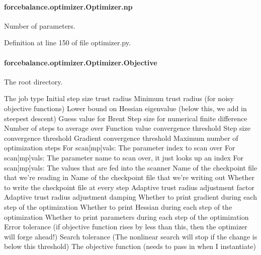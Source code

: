 \hypertarget{classforcebalance_1_1optimizer_1_1Optimizer_af198da71b849e8e10611bf16ea5914cf}{
\paragraph[{np}]{\setlength{\rightskip}{0pt plus 5cm}forcebalance.\-optimizer.\-Optimizer.\-np}}\label{classforcebalance_1_1optimizer_1_1Optimizer_af198da71b849e8e10611bf16ea5914cf}


Number of parameters. 



Definition at line 150 of file optimizer.\-py.

\hypertarget{classforcebalance_1_1optimizer_1_1Optimizer_a485c636c02ff86bb7709a44582c7693e}{
\paragraph[{Objective}]{\setlength{\rightskip}{0pt plus 5cm}forcebalance.\-optimizer.\-Optimizer.\-Objective}}\label{classforcebalance_1_1optimizer_1_1Optimizer_a485c636c02ff86bb7709a44582c7693e}


The root directory. 

The job type Initial step size trust radius Minimum trust radius (for noisy objective functions) Lower bound on Hessian eigenvalue (below this, we add in steepest descent) Guess value for Brent Step size for numerical finite difference Number of steps to average over Function value convergence threshold Step size convergence threshold Gradient convergence threshold Maximum number of optimization steps For scan\mbox{[}mp\mbox{]}vals\-: The parameter index to scan over For scan\mbox{[}mp\mbox{]}vals\-: The parameter name to scan over, it just looks up an index For scan\mbox{[}mp\mbox{]}vals\-: The values that are fed into the scanner Name of the checkpoint file that we're reading in Name of the checkpoint file that we're writing out Whether to write the checkpoint file at every step Adaptive trust radius adjustment factor Adaptive trust radius adjustment damping Whether to print gradient during each step of the optimization Whether to print Hessian during each step of the optimization Whether to print parameters during each step of the optimization Error tolerance (if objective function rises by less than this, then the optimizer will forge ahead!) Search tolerance (The nonlinear search will stop if the change is below this threshold) The objective function (needs to pass in when I instantiate) 

